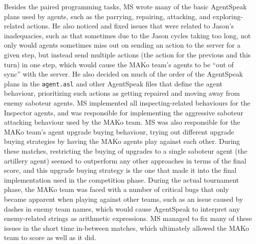 Besides the paired programming tasks, MS wrote many of the basic AgentSpeak plans used by agents, such as the parrying, repairing, attacking, and exploring-related actions.
He also noticed and fixed issues that were related to Jason's inadequacies, such as that sometimes due to the Jason cycles taking too long, not only would agents sometimes miss out on sending an action to the server for a given step, but instead send multiple actions (the action for the previous and this turn) in one step, which would cause the MAKo team's agents to be \enquote{out of sync} with the server.
He also decided on much of the order of the AgentSpeak plans in the \texttt{agent.asl} and other AgentSpeak files that define the agent behaviour, prioritizing such actions as getting repaired and moving away from enemy saboteur agents.
MS implemented all inspecting-related behaviours for the Inspector agents, and was responsible for implementing the aggressive saboteur attacking behaviour used by the MAKo team.
MS was also responsible for the MAKo team's agent upgrade buying behaviour, trying out different upgrade buying strategies by having the MAKo agents play against each other.
During these matches, restricting the buying of upgrades to a single saboteur agent (the artillery agent) seemed to outperform any other approaches in terms of the final score, and this upgrade buying strategy is the one that made it into the final implementation used in the competition phase.
During the actual tournament phase, the MAKo team was faced with a number of critical bugs that only became apparent when playing against other teams, such as an issue caused by dashes in enemy team names, which would cause AgentSpeak to interpret any enemy-related strings as arithmetic expressions.
MS managed to fix many of these issues in the short time in-between matches, which ultimately allowed the MAKo team to score as well as it did.
